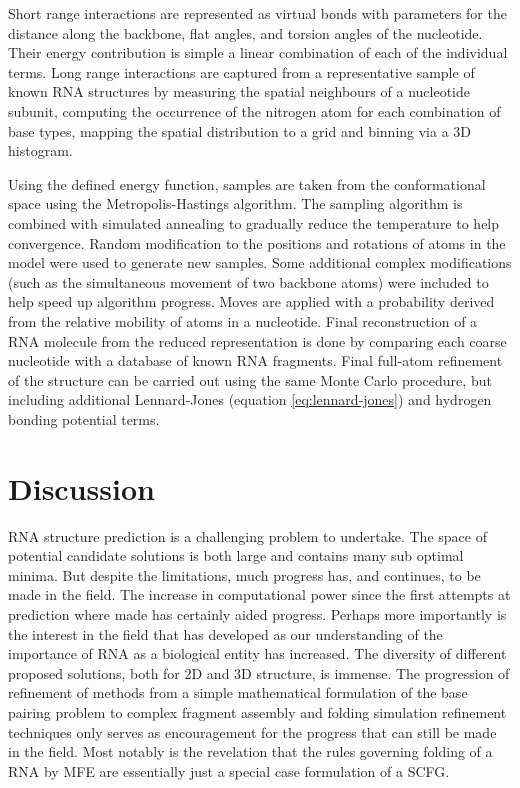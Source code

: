 \documentclass[journal]{IEEEtran}
\begin{document}
Short range interactions are represented as virtual bonds with parameters for the distance along the backbone, flat angles, and torsion angles of the nucleotide. Their energy contribution is simple a linear combination of each of the individual terms. Long range interactions are captured from a representative sample of known RNA structures by measuring the spatial neighbours of a nucleotide subunit, computing the occurrence of the nitrogen atom for each combination of base types, mapping the spatial distribution to a grid and binning via a 3D histogram. 

Using the defined energy function, samples are taken from the conformational space using the Metropolis-Hastings algorithm. The sampling algorithm is combined with simulated annealing to gradually reduce the temperature to help convergence. Random modification to the positions and rotations of atoms in the model were used to generate new samples. Some additional complex modifications (such as the simultaneous movement of two backbone atoms) were included to help speed up algorithm progress. Moves are applied with a probability derived from the relative mobility of atoms in a nucleotide. Final reconstruction of a RNA molecule from the reduced representation is done by comparing each coarse nucleotide with a database of known RNA fragments. Final full-atom refinement of the structure can be carried out using the same Monte Carlo procedure, but including additional Lennard-Jones (equation \ref{eq:lennard-jones}) and hydrogen bonding potential terms.

\section{Discussion}
\label{sec:discussion}
RNA structure prediction is a challenging problem to undertake. The space of potential candidate solutions is both large and contains many sub optimal minima. But despite the limitations, much progress has, and continues, to be made in the field. The increase in computational power since the first attempts at prediction where made has certainly aided progress. Perhaps more importantly is the interest in the field that has developed as our understanding of the importance of RNA as a biological entity has increased. The diversity of different proposed solutions, both for 2D and 3D structure, is immense. The progression of refinement of methods from a simple mathematical formulation of the base pairing problem to complex fragment assembly and folding simulation refinement techniques only serves as encouragement for the progress that can still be made in the field. Most notably is the revelation that the rules governing folding of a RNA by MFE are essentially just a special case formulation of a SCFG.
\end{document}
